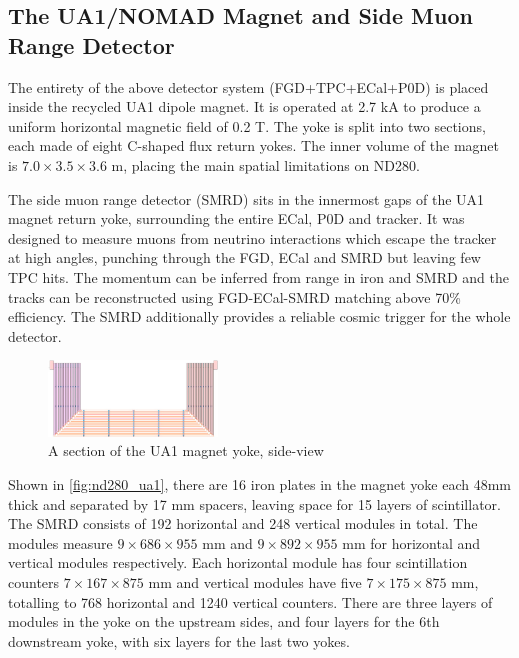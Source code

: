 \subsection{The UA1/NOMAD Magnet and Side Muon Range Detector}
The entirety of the above detector system (FGD+TPC+ECal+P0D) is placed inside the recycled UA1 dipole magnet. It is operated at 2.7 kA to produce a uniform horizontal magnetic field of 0.2 T. The  yoke is split into two sections, each made of eight C-shaped flux return yokes. The inner volume of the magnet is $7.0\times3.5\times3.6\text{ m}$, placing the main spatial limitations on ND280.

The side muon range detector (SMRD)\cite{t2k_smrd} sits in the innermost gaps of the UA1 magnet return yoke, surrounding the entire ECal, P0D and tracker. It was designed to measure muons from neutrino interactions which escape the tracker at high angles, punching through the FGD, ECal and SMRD but leaving few TPC hits. The momentum can be inferred from range in iron and SMRD and the tracks can be reconstructed using FGD-ECal-SMRD matching above 70\% efficiency. The SMRD additionally provides a reliable cosmic trigger for the whole detector. 
\begin{figure}[h]
	\includegraphics[width=0.4\textwidth, trim={0mm 0mm 0mm 0mm}, clip,page=1]{figures/det_chap/smrd/ua1_smrd}
	\caption{A section of the UA1 magnet yoke, side-view}
	\label{fig:nd280_ua1}
\end{figure}

Shown in \autoref{fig:nd280_ua1}, there are 16 iron plates in the magnet yoke each 48mm thick and separated by 17 mm spacers, leaving space for 15 layers of scintillator. The SMRD consists of 192 horizontal and 248 vertical modules in total. The modules measure $9\times686\times955\text{ mm}$ and $9\times892\times955\text{ mm}$ for horizontal and vertical modules respectively. Each horizontal module has four scintillation counters $7\times167\times875\text{ mm}$ and vertical modules have five $7\times175\times875\text{ mm}$, totalling to 768 horizontal and 1240 vertical counters. There are three layers of modules in the yoke on the upstream sides, and four layers for the 6th downstream yoke, with six layers for the last two yokes.

